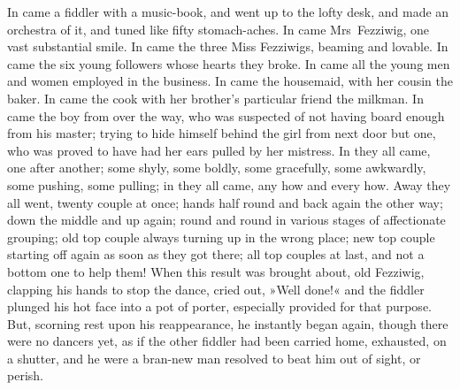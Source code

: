In came a fiddler with a music-book, and went up to the lofty desk, and made an orchestra of it, and tuned like fifty stomach-aches. In came Mrs~Fezziwig, one vast substantial smile. In came the three Miss Fezziwigs, beaming and lovable. In came the six young followers whose hearts they broke. In came all the young men and women employed in the business. In came the housemaid, with her cousin the baker. In came the cook with her broth\-er's particular friend the milkman. In came the boy from over the way, who was suspected of not having board enough from his master; trying to hide himself behind the girl from next door but one, who was proved to have had her ears pulled by her mistress. In they all came, one after another; some shyly, some boldly, some gracefully, some awkwardly, some pushing, some pulling; in they all came, any how and every how. Away they all went, twenty couple at once; hands half round and back again the other way; down the middle and up again; round and round in various stages of affectionate grouping; old top couple always turning up in the wrong place; new top couple starting off again as soon as they got there; all top couples at last, and not a bottom one to help them! When this result was brought about, old Fezziwig, clapping his hands to stop the dance, cried out, »Well done!« and the fiddler plunged his hot face into a pot of porter, especially provided for that purpose. But, scorning rest upon his reappearance, he instantly began again, though there were no dancers yet, as if the other fiddler had been carried home, exhausted, on a shutter, and he were a bran-new man resolved to beat him out of sight, or perish.


